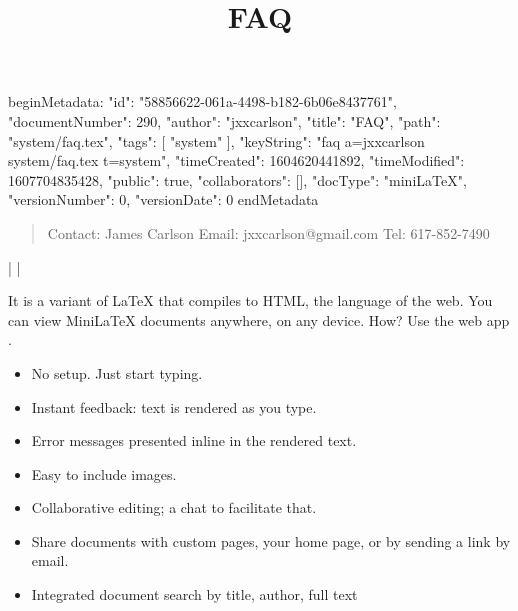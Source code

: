 beginMetadata:
{
    "id": "58856622-061a-4498-b182-6b06e8437761",
    "documentNumber": 290,
    "author": "jxxcarlson",
    "title": "FAQ",
    "path": "system/faq.tex",
    "tags": [
        "system"
    ],
    "keyString": "faq a=jxxcarlson system/faq.tex t=system",
    "timeCreated": 1604620441892,
    "timeModified": 1607704835428,
    "public": true,
    "collaborators": [],
    "docType": "miniLaTeX",
    "versionNumber": 0,
    "versionDate": 0
}
endMetadata
\title{FAQ}


\bigskip


\begin{verse}
Contact: James Carlson
Email: jxxcarlson@gmail.com
Tel: 617-852-7490
\end{verse}

 |
 |


\begin{defitem}
It is a variant of LaTeX that compiles to HTML, the language of the web.
You can view MiniLaTeX documents anywhere, on any device. How? Use the web app
. 
\end{defitem}


\begin{defitem}


\begin{itemize}

\item No setup. Just start typing.

\item Instant feedback: text is rendered as you type.

\item Error messages presented inline in the rendered text.

\item Easy to include images.

\item Collaborative editing; a chat to facilitate that.

\item Share documents with custom pages, your home page, or by sending a link by email.

\item Integrated document search by title, author, full text

\end{itemize}

\end{defitem}



